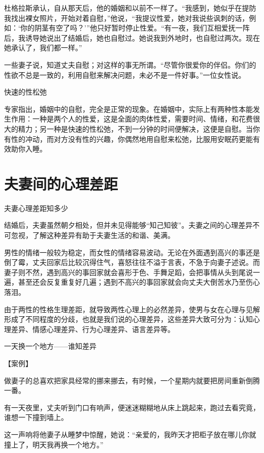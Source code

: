 \documentclass[12pt,UTF8,openany]{ctexbook}
\begin{document}
杜格拉斯承认，自从那天后，他的婚姻和以前不一样了。“我感到，她似乎在提防我找出裸女照片，开始对着自慰，”他说，“我提议性爱，她对我说些讽刺的话，例如：‘你的阴茎有空了吗？’”他只好暂时停止性爱。“有一夜，我们互相爱抚一阵后，我诱导她说出了结婚后，她也自慰过。她说我到外地时，也自慰过两次。现在她承认了，我们都一样。”

一些妻子说，知道丈夫自慰；对这样的事无所谓。“尽管你很爱你的伴侣。你们的性欲不总是一致的，利用自慰来解决问题，未必不是一件好事。”一位女性说。





快速的性松弛


专家指出，婚姻中的自慰，完全是正常的现象。在婚姻中，实际上有两种性本能发生作用：一种是两个人的性爱，这是全面的肉体性爱，需要时间、情绪，和花费很大的精力；另一种是快速的性松弛，不到一分钟的时间便解决，这便是自慰。当你有性的冲动，而对方没有性的兴趣，你偶然地用自慰来松弛，比服用安眠药更能有效助你入睡。





\chapter{夫妻间的心理差距}


夫妻心理差距知多少


结婚后，夫妻虽然朝夕相处，但并未见得能够“知己知彼”。夫妻之间的心理差异不可忽视，了解这种差异有助于夫妻生活的和谐、美满。

男性的情绪一般较为稳定，而女性的情绪容易波动。无论在外面遇到高兴的事还是倒了霉，丈夫回家后比较沉得住气，喜怒往往不溢于言表，不急于向妻子述说。而妻子则不然，遇到高兴的事回家就会喜形于色、手舞足蹈，会把事情从头到尾说一遍，甚至还会反复重复好几遍；遇到不高兴的事回家就会向丈夫大倒苦水乃至伤心落泪。

由于两性的性格生理差距，就导致两性心理上的必然差异，使男与女在心理与见解形成了不同程度的分歧，也就是我们说的心理差异，这些差异大致可分为：认知心理差异、情感心理差异、行为心理差异、语言差异等。





一天换一个地方——谁知差异


【案例】

做妻子的总喜欢把家具经常的挪来挪去，有时候，一个星期内就要把房间重新倒腾一番。

有一天夜里，丈夫听到门口有响声，便迷迷糊糊地从床上跳起来，跑过去看究竟，谁想一下撞到墙上。

这一声响将他妻子从睡梦中惊醒，她说：“亲爱的，我昨天才把柜子放在哪儿你就撞上了，明天我再换一个地方。”
\end{document}
